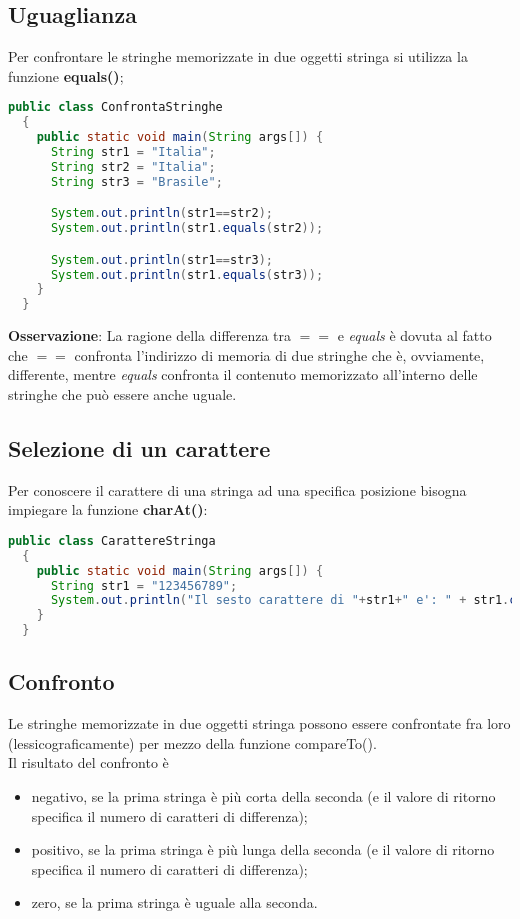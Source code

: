 \documentclass[a4paper]{extarticle}
\begin{document}
\newpage
\subsection{Uguaglianza}
Per confrontare le stringhe memorizzate in due oggetti stringa si utilizza la funzione \textbf{equals()};

\vspace{1em}
\noindent
\begin{lstlisting}[language=Java, caption=Uguaglianza fra stringhe in Java]
  public class ConfrontaStringhe
  {
    public static void main(String args[]) {
      String str1 = "Italia";
      String str2 = "Italia";
      String str3 = "Brasile";

      System.out.println(str1==str2);
      System.out.println(str1.equals(str2));

      System.out.println(str1==str3);
      System.out.println(str1.equals(str3));
    }
  }
\end{lstlisting}

\vspace{1em}
\noindent
\textbf{Osservazione}: La ragione della differenza tra $==$ e \emph{equals} è dovuta al fatto che $==$ confronta l'indirizzo di memoria di due stringhe che è, ovviamente, differente, mentre \emph{equals} confronta il contenuto memorizzato all'interno delle stringhe che può essere anche uguale.

\vspace{1em}
\subsection{Selezione di un carattere}
Per conoscere il carattere di una stringa ad una specifica posizione bisogna impiegare la funzione \textbf{charAt()}:

\vspace{1em}
\noindent
\begin{lstlisting}[language=Java, caption=Uguaglianza fra stringhe in Java]
  public class CarattereStringa
  {
    public static void main(String args[]) {
      String str1 = "123456789";
      System.out.println("Il sesto carattere di "+str1+" e': " + str1.charAt(6));
    }
  }
\end{lstlisting}

\vspace{1em}
\subsection{Confronto}
Le stringhe memorizzate in due oggetti stringa possono essere confrontate fra loro (lessicograficamente) per mezzo della funzione compareTo().\\
Il risultato del confronto è
\begin{itemize}
  \item negativo, se la prima stringa è più corta della seconda (e il valore di ritorno specifica il numero di caratteri di differenza);
  \item positivo, se la prima stringa è più lunga della seconda (e il valore di ritorno specifica il numero di caratteri di differenza);
  \item zero, se la prima stringa è uguale alla seconda.
\end{itemize}
\end{document}

